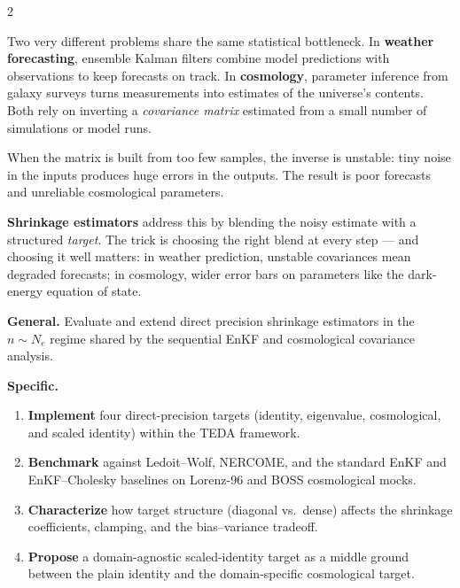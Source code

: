 \documentclass[11pt]{article}
\begin{document}
\begin{multicols}{2}

\begin{tcolorbox}[posterbox=Context]
\small
Two very different problems share the same statistical bottleneck. In
\textbf{weather forecasting}, ensemble Kalman filters combine model predictions
with observations to keep forecasts on track. In \textbf{cosmology},
parameter inference from galaxy surveys turns measurements into estimates of
the universe's contents. Both rely on inverting a \emph{covariance matrix}
estimated from a small number of simulations or model runs.

When the matrix is built from too few samples, the inverse is unstable: tiny
noise in the inputs produces huge errors in the outputs. The result is poor
forecasts and unreliable cosmological parameters.

\textbf{Shrinkage estimators} address this by blending the noisy estimate
with a structured \emph{target}. The trick is choosing the right blend at
every step --- and choosing it well matters: in weather prediction,
unstable covariances mean degraded forecasts; in cosmology, wider
error bars on parameters like the dark-energy equation of state.
\end{tcolorbox}

\begin{tcolorbox}[posterbox=Objectives]
\small
\textbf{General.} Evaluate and extend direct precision shrinkage
estimators in the $n \sim N_e$ regime shared by the sequential EnKF
and cosmological covariance analysis.

\vspace{2pt}
\textbf{Specific.}
\begin{enumerate}
\item \textbf{Implement} four direct-precision targets (identity,
      eigenvalue, cosmological, and scaled identity) within the TEDA
      framework.
\item \textbf{Benchmark} against Ledoit--Wolf, NERCOME, and the
      standard EnKF and EnKF--Cholesky baselines on Lorenz-96 and
      BOSS cosmological mocks.
\item \textbf{Characterize} how target structure (diagonal vs.\ dense)
      affects the shrinkage coefficients, clamping, and the
      bias--variance tradeoff.
\item \textbf{Propose} a domain-agnostic scaled-identity target as a
      middle ground between the plain identity and the
      domain-specific cosmological target.
\end{enumerate}
\end{tcolorbox}


\end{multicols}
\end{document}
